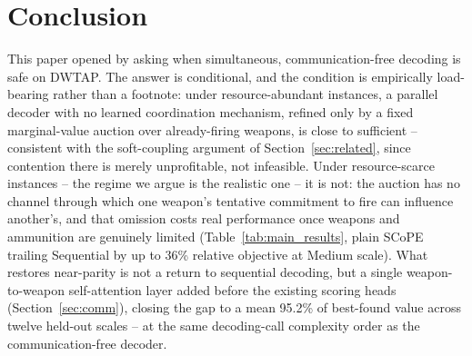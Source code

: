 
\section{Conclusion}
\label{sec:conclusion}

This paper opened by asking when simultaneous, communication-free decoding is safe on DWTAP. The answer is conditional, and the condition is empirically load-bearing rather than a footnote: under resource-abundant instances, a parallel decoder with no learned coordination mechanism, refined only by a fixed marginal-value auction over already-firing weapons, is close to sufficient -- consistent with the soft-coupling argument of Section~\ref{sec:related}, since contention there is merely unprofitable, not infeasible. Under resource-scarce instances -- the regime we argue is the realistic one -- it is not: the auction has no channel through which one weapon's tentative commitment to fire can influence another's, and that omission costs real performance once weapons and ammunition are genuinely limited (Table~\ref{tab:main_results}, plain SCoPE trailing Sequential by up to 36\% relative objective at Medium scale). What restores near-parity is not a return to sequential decoding, but a single weapon-to-weapon self-attention layer added before the existing scoring heads (Section~\ref{sec:comm}), closing the gap to a mean 95.2\% of best-found value across twelve held-out scales -- at the same decoding-call complexity order as the communication-free decoder.

